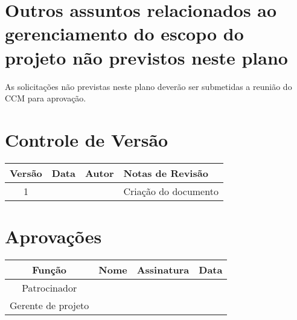 \section{Outros assuntos relacionados ao gerenciamento do escopo do projeto não previstos neste plano}

As solicitações não previstas neste plano deverão ser submetidas a reunião do CCM para aprovação.

\section{Controle de Versão}

\begin{table}[H]
	\begin{tabularx}{\textwidth}{| c | c | X | X |}
		\hline
		\textbf{Versão} & \textbf{Data} & \textbf{Autor}      & \textbf{Notas de Revisão} \\
		\hline
		1                &               & \projectManagerName & Criação do documento     \\
		\hline
	\end{tabularx}
	\centering
\end{table}

\section{Aprovações}

\begin{table}[H]
	\begin{tabularx}{\textwidth}{| c | c | X | c |}
		\hline
		\textbf{Função}  & \textbf{Nome}       & \textbf{Assinatura}      & \textbf{Data} \\
		\hline
		Patrocinador       & \projectSponsorName & \projectSponsorSignature &               \\
		\hline
		Gerente de projeto & \projectManagerName & \projectManagerSignature &               \\
		\hline
	\end{tabularx}
	\centering
\end{table}